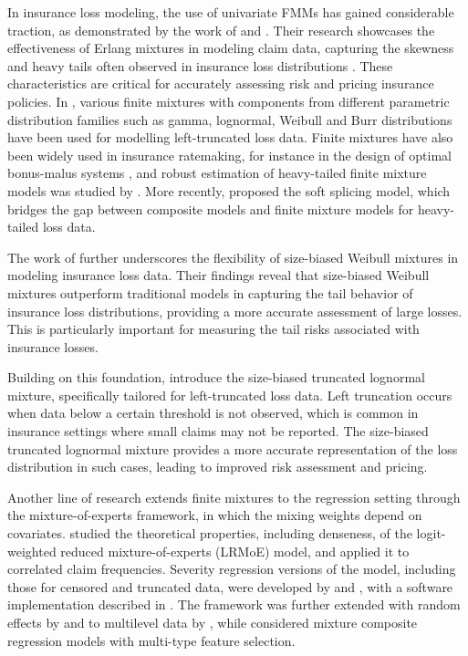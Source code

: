 \documentclass[eng]{csam}
\begin{document}
In insurance loss modeling, the use of univariate FMMs has gained considerable traction, as demonstrated by the work of \citet{leelin2010} and \citet{Verbelen2015}. Their research showcases the effectiveness of Erlang mixtures in modeling claim data, capturing the skewness and heavy tails often observed in insurance loss distributions \citep{Klugman2019}. These characteristics are critical for accurately assessing risk and pricing insurance policies. In \citet{blostein2019modeling}, various finite mixtures with components from different parametric distribution families such as gamma, lognormal, Weibull and Burr distributions have been used for modelling left-truncated loss data. Finite mixtures have also been widely used in insurance ratemaking, for instance in the design of optimal bonus-malus systems \citep{tzougas2014optimal, tzougas2018bonus}, and robust estimation of heavy-tailed finite mixture models was studied by \citet{fung2022maximum}. More recently, \citet{fung2024soft} proposed the soft splicing model, which bridges the gap between composite models and finite mixture models for heavy-tailed loss data.

The work of \citet{bae2020mixtures} further underscores the flexibility of size-biased Weibull mixtures in modeling insurance loss data. Their findings reveal that size-biased Weibull mixtures outperform traditional models in capturing the tail behavior of insurance loss distributions, providing a more accurate assessment of large losses. This is particularly important for measuring the tail risks associated with insurance losses.

Building on this foundation, \citet{bae2024loss} introduce the size-biased truncated lognormal mixture, specifically tailored for left-truncated loss data. Left truncation occurs when data below a certain threshold is not observed, which is common in insurance settings where small claims may not be reported. The size-biased truncated lognormal mixture provides a more accurate representation of the loss distribution in such cases, leading to improved risk assessment and pricing.

Another line of research extends finite mixtures to the regression setting through the mixture-of-experts framework, in which the mixing weights depend on covariates. \citet{fung2019class_theory} studied the theoretical properties, including denseness, of the logit-weighted reduced mixture-of-experts (LRMoE) model, and \citet{fung2019class_freq} applied it to correlated claim frequencies. Severity regression versions of the model, including those for censored and truncated data, were developed by \citet{fung2021new} and \citet{fung2022fitting}, with a software implementation described in \citet{tseung2021lrmoe}. The framework was further extended with random effects by \citet{tseung2023improving} and to multilevel data by \citet{fung2025mixture}, while \citet{fung2023mixture} considered mixture composite regression models with multi-type feature selection.
\end{document}
